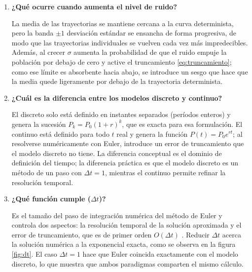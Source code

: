 \documentclass[11pt,a4paper]{article}
\begin{document}
\begin{enumerate}[leftmargin=*]
  Es la desviaci\'on est\'andar del ruido aditivo normal de media cero que se suma en cada
  per\'iodo. Representa el \textbf{nivel de variabilidad o incertidumbre} del sistema: no
  modifica la tendencia, sino la dispersi\'on de las trayectorias alrededor de ella. El caso
  l\'imite $\sigma = 0$ degenera el modelo estoc\'astico en el modelo discreto
  determin\'istico.

  \item \textbf{¿Qu\'e ocurre cuando aumenta el nivel de ruido?}

  La media de las trayectorias se mantiene cercana a la curva determinista, pero la banda
  $\pm 1$ desviaci\'on est\'andar se ensancha de forma progresiva, de modo que las
  trayectorias individuales se vuelven cada vez m\'as impredecibles. Adem\'as, al crecer
  $\sigma$ aumenta la probabilidad de que el ruido empuje la poblaci\'on por debajo de cero
  y active el truncamiento \eqref{eq:truncamiento}; como ese l\'imite es absorbente hacia
  abajo, se introduce un sesgo que hace que la media quede ligeramente por debajo de la
  trayectoria determinista.

  \item \textbf{¿Cu\'al es la diferencia entre los modelos discreto y continuo?}

  El discreto solo est\'a definido en instantes separados (per\'iodos enteros) y genera la
  sucesi\'on $P_k = P_0(1+r)^{k}$, que es exacta para esa formulaci\'on. El continuo est\'a
  definido para todo $t$ real y genera la funci\'on $P(t) = P_0e^{rt}$; al resolverse
  num\'ericamente con Euler, introduce un error de truncamiento que el modelo discreto no
  tiene. La diferencia conceptual es el dominio de definici\'on del tiempo; la diferencia
  pr\'actica es que el modelo discreto es un m\'etodo de un paso con $\Delta t = 1$, mientras
  el continuo permite refinar la resoluci\'on temporal.

  \item \textbf{¿Qu\'e funci\'on cumple ($\Delta t$)?}

  Es el tamaño del paso de integraci\'on num\'erica del m\'etodo de Euler y controla dos
  aspectos: la resoluci\'on temporal de la soluci\'on aproximada y el error de
  truncamiento, que es de primer orden $O(\Delta t)$ \cite{burden2011}. Reducir $\Delta t$
  acerca la soluci\'on num\'erica a la exponencial exacta, como se observa en la
  figura \ref{fig:dt}. El caso $\Delta t = 1$ hace que Euler coincida exactamente con el
  modelo discreto, lo que muestra que ambos paradigmas comparten el mismo c\'alculo.


\end{enumerate}
\end{document}
